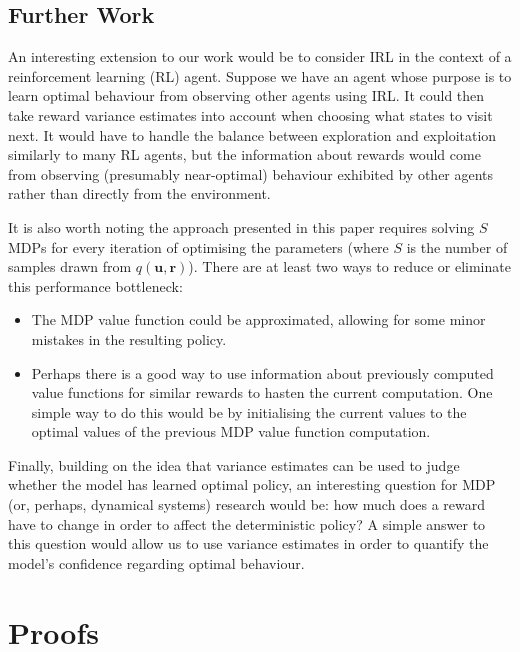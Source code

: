 \documentclass{mpaper}
\newcommand{\approximation}{q(\mathbf{u}, \mathbf{r})}
\begin{document}
\subsection{Further Work}

An interesting extension to our work would be to consider IRL in the context
of a reinforcement learning (RL) agent. Suppose we have an agent whose purpose
is to learn optimal behaviour from observing other agents using IRL. It could
then take reward variance estimates into account when choosing what states to
visit next. It would have to handle the balance between exploration and
exploitation similarly to many RL agents, but the information about rewards
would come from observing (presumably near-optimal) behaviour exhibited by other
agents rather than directly from the environment.

It is also worth noting the approach presented in this paper requires solving
$S$ MDPs for every iteration of optimising the parameters (where $S$ is the
number of samples drawn from $\approximation$). There are at least two ways to
reduce or eliminate this performance bottleneck:
\begin{itemize}
\item The MDP value function could be approximated, allowing for some minor
  mistakes in the resulting policy.
\item Perhaps there is a good way to use information about previously computed
  value functions for similar rewards to hasten the current computation. One
  simple way to do this would be by initialising the current values to the
  optimal values of the previous MDP value function computation.
\end{itemize}

Finally, building on the idea that variance estimates can be used to judge
whether the model has learned optimal policy, an interesting question for
MDP (or, perhaps, dynamical systems) research would be: how much does a reward
have to change in order to affect the deterministic policy? A simple answer to
this question would allow us to use variance estimates in order to quantify the
model's confidence regarding optimal behaviour.




\appendix
\section{Proofs} \label{appendix:proofs}
\end{document}
